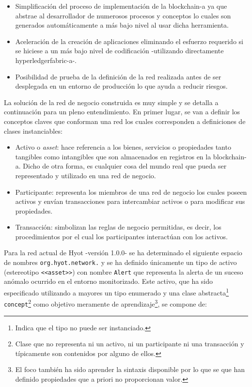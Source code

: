\documentclass[12pt,a4paper, twoside]{report}
\begin{document}
	\begin{itemize}
		\item Simplificación del proceso de implementación de la \gls{blockchain-a} ya que abstrae al desarrollador de numerosos procesos y conceptos lo cuales son generados automáticamente a más bajo nivel al usar dicha herramienta.
		\item Aceleración de la creación de aplicaciones eliminando el esfuerzo requerido si se hiciese a un más bajo nivel de codificación -utilizando directamente \gls{hyperledgerfabric-a}-.
		\item Posibilidad de prueba de la definición de la red realizada antes de ser desplegada en un entorno de producción lo que ayuda a reducir riesgos.
	\end{itemize}
	
	La solución de la red de negocio construida es muy simple y se detalla a continuación para un pleno entendimiento. En primer lugar, se van a definir los conceptos claves que conforman una red los cuales corresponden a definiciones de clases instanciables:
	
	\begin{itemize}
		\item Activo o \textit{asset}: hace referencia a los bienes, servicios o propiedades tanto tangibles como intangibles que son almacenados en registros en la \gls{blockchain-a}. Dicho de otra forma, es cualquier cosa del mundo real que pueda ser representado y utilizado en una red de negocio.
		\item Participante: representa los miembros de una red de negocio los cuales poseen activos y envían transacciones para intercambiar activos o para modificar sus propiedades.
		\item Transacción: simbolizan las reglas de negocio permitidas, es decir, los procedimientos por el cual los participantes interactúan con los activos.
	\end{itemize}

	Para la red actual de Hyot -versión 1.0.0- se ha determinado el siguiente espacio de nombres \texttt{org.hyot.network.} y se ha definido únicamente un tipo de activo (estereotipo \texttt{<<asset>>}) con nombre \texttt{Alert} que representa la alerta de un suceso anómalo ocurrido en el entorno monitorizado. Este activo, que ha sido especificado utilizando a mayores un tipo enumerado y una clase abstracta\footnote{Indica que el tipo no puede ser instanciado.} \texttt{concept}\footnote{Clase que no representa ni un activo, ni un participante ni una transacción y típicamente son contenidos por alguno de ellos.} como objetivo meramente de aprendizaje\footnote{El foco también ha sido aprender la sintaxis disponible por lo que se que han definido propiedades que a priori no proporcionan valor.}, se compone de:
	
\end{document}

